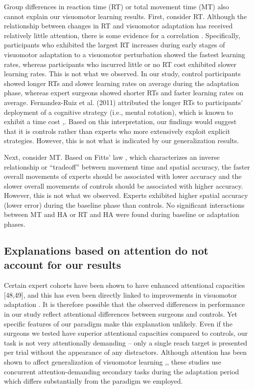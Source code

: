 \documentclass[jou, 11pt, longtable, floatsintext, notab]{apa6}
\begin{document}
Group differences in reaction time (RT) or total movement
time (MT) also cannot explain our visuomotor learning
results. First, consider RT. Although the relationship
between changes in RT and visuomotor adaptation has received
relatively little attention, there is some evidence for a
correlation \cite{anguera_contributions_2010}. Specifically,
participants who exhibited the largest RT increases during
early stages of visuomotor adaptation to a visuomotor
perturbation showed the fastest learning rates, whereas
participants who incurred little or no RT cost exhibited
slower learning rates. This is not what we observed. In our
study, control participants showed longer RTs and slower
learning rates on average during the adaptation phase,
whereas expert surgeons showed shorter RTs and faster
learning rates on average. Fernandez-Ruiz et al. (2011)
\cite{fernandez-ruiz_relation_2011} attributed the longer
RTs to participants’ deployment of a cognitive strategy
(i.e., mental rotation), which is known to exhibit a time
cost
\cite{mackenzie_movement_1995},\cite{green_action_2003}.
Based on this interpretation, our findings would suggest
that it is controls rather than experts who more extensively
exploit explicit strategies. However, this is not what is
indicated by our generalization results.

Next, consider MT. Based on Fitts’ law
\cite{bavelier_enhancing_2019}, which characterizes an
inverse relationship or “tradeoff” between movement time and
spatial accuracy, the faster overall movements of experts
should be associated with lower accuracy and the slower
overall movements of controls should be associated with
higher accuracy. However, this is not what we observed.
Experts exhibited higher spatial accuracy (lower error)
during the baseline phase than controls. No significant
interactions between MT and HA or RT and HA were found
during baseline or adaptation phases.

\subsection{Explanations based on attention do not account 
for our results}
Certain expert cohorts have been shown to have enhanced
attentional capacities [48,49], and this has even been
directly linked to improvements in visuomotor adaptation
\cite{debats_explicit_2018}. It is therefore possible that
the observed differences in performance in our study reflect
attentional differences between surgeons and controls. Yet
specific features of our paradigm make this explanation
unlikely. Even if the surgeons we tested have superior
attentional capacities compared to controls, our task is not
very attentionally demanding – only a single reach target is
presented per trial without the appearance of any
distractors. Although attention has been shown to affect
generalization of visuomotor learning
\cite{bedard_attention_2013},\cite{wang_impaired_2017},
these studies use concurrent attention-demanding secondary
tasks during the adaptation period which differs
substantially from the paradigm we employed.
\end{document}
